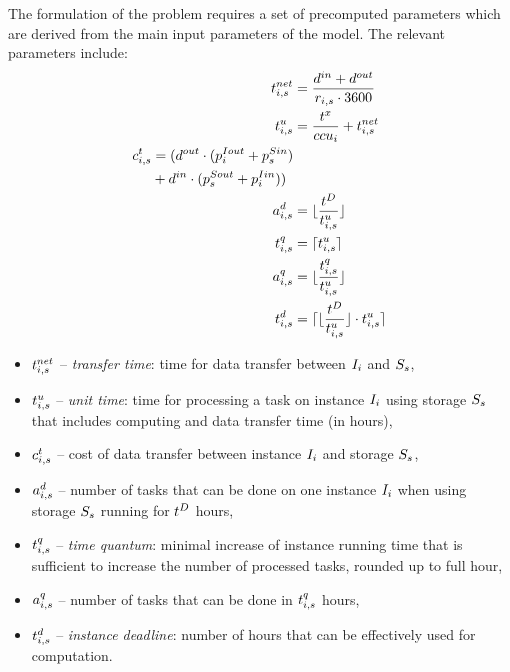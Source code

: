{  The formulation of the problem requires a set of precomputed parameters which are derived from the main input parameters of the model. The relevant  parameters include:
  \begin{align}
      \transferTime_{i,s} &= \frac{\dataSizeIn+\dataSizeOut}{\transferRate_{i,s} \cdot 3600}  \\
      \label{unitTime}\unitTime_{i,s} &= \frac{\execTime}{\ccu_i} + \transferTime_{i,s}  \\
      \begin{split}
          \transferCost_{i,s} &= (\dataSizeOut \cdot
          (\instanceTransferPriceOut_i + \storageTransferPriceIn_s) \\ & +
          \dataSizeIn \cdot (\storageTransferPriceOut_s+\instanceTransferPriceIn_i)) \end{split} \\
      \label{tasksPerDeadline}\tasksPerDeadline_{i,s} &= \lfloor\frac{\deadline}{\unitTime_{i,s}}\rfloor \\
      \timeQuantum_{i,s} &= \lceil \unitTime_{i,s} \rceil \\
      \tasksPerTimeQuantum_{i,s} &= \lfloor\frac{\timeQuantum_{i,s}}{\unitTime_{i,s}}\rfloor \\
      \label{instanceDeadline}\instanceDeadline_{i,s} &= \lceil\lfloor\frac{\deadline}{\unitTime_{i,s}} \rfloor \cdot \unitTime_{i,s} \rceil
  \end{align}
  \begin{itemize}
      \item $t^{net}_{i,s}$ -- {\em transfer time}: time for data transfer between
      $I_i$ and $S_s$,
      \item $t^u_{i,s}$ -- {\em unit time}: time for processing a task
      on instance $I_i$ using storage $S_s$ that includes computing and
      data transfer time (in hours),
      \item $c^t_{i,s}$ -- cost of data transfer between instance
      $I_i$ and storage $S_s$,
      \item $a^d_{i,s}$ -- number of tasks that can be done on
      one instance $I_i$ when using storage $S_s$ running for $t^D$ hours,
      \item $t^q_{i,s}$ -- {\em time quantum}: minimal increase of
      instance running time that is sufficient to increase the number of
      processed tasks, rounded up to full hour,
      \item $a^q_{i,s}$ -- number of tasks that can be done
      in $t^q_{i,s}$ hours,
      \item $t^d_{i,s}$ -- {\em instance deadline}: number of
      hours that can be effectively used for computation.
  \end{itemize}

}
